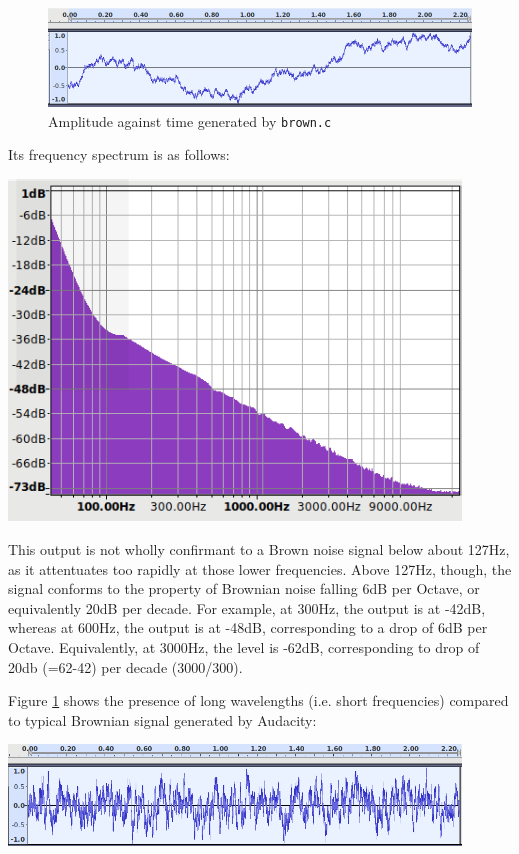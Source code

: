 \documentclass[a4paper,10pt]{article}
\def\code#1{\texttt{#1}}
\begin{document}
\begin{figure}[h]
\centering
\includegraphics[width=12cm]{brown-amp.png}
\caption{Amplitude against time generated by \code{brown.c}}
\label{fig:brownamp}
\end{figure}

Its frequency spectrum is as follows:
\begin{center}
\includegraphics[width=12cm]{brown-freq.png}
\end{center}

This output is not wholly confirmant to a Brown noise signal below about 127Hz, as it attentuates too rapidly at those lower frequencies. Above 127Hz, though, the signal conforms to the property of Brownian noise falling 6dB per Octave, or equivalently 20dB per decade\cite{brown}. For example, at 300Hz, the output is at -42dB, whereas at 600Hz, the output is at -48dB, corresponding to a drop of 6dB per Octave. Equivalently, at 3000Hz, the level is -62dB, corresponding to drop of 20db (=62-42) per decade (3000/300).

Figure \ref{fig:brownamp} shows the presence of long wavelengths (i.e. short frequencies) compared to typical Brownian signal generated by Audacity:
\begin{center}
\includegraphics[width=12cm]{brown-amp-audacity.png}
\end{center}
\end{document}

